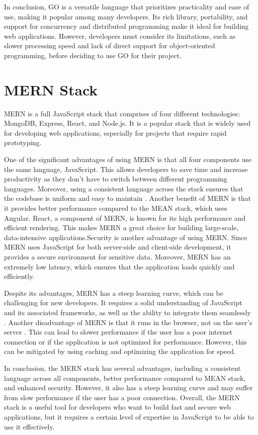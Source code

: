 In conclusion, GO is a versatile language that prioritizes practicality and ease of use, making it popular among many developers. Its rich library, portability, and support for concurrency and distributed programming make it ideal for building web applications. However, developers must consider its limitations, such as slower processing speed and lack of direct support for object-oriented programming, before deciding to use GO for their project.

\section{MERN Stack}
MERN is a full JavaScript stack that comprises of four different technologies: MongoDB, Express, React, and Node.js. It is a popular stack that is widely used for developing web applications, especially for projects that require rapid prototyping.

One of the significant advantages of using MERN is that all four components use the same language, JavaScript. This allows developers to save time and increase productivity as they don't have to switch between different programming languages. Moreover, using a consistent language across the stack ensures that the codebase is uniform and easy to maintain \cite{shama}. Another benefit of MERN is that it provides better performance compared to the MEAN stack, which uses Angular. React, a component of MERN, is known for its high performance and efficient rendering. This makes MERN a great choice for building large-scale, data-intensive applications.Security is another advantage of using MERN. Since MERN uses JavaScript for both server-side and client-side development, it provides a secure environment for sensitive data. Moreover, MERN has an extremely low latency, which ensures that the application loads quickly and efficiently.

Despite its advantages, MERN has a steep learning curve, which can be challenging for new developers. It requires a solid understanding of JavaScript and its associated frameworks, as well as the ability to integrate them seamlessly \cite{eddy}. Another disadvantage of MERN is that it runs in the browser, not on the user's server \cite{asvj}. This can lead to slower performance if the user has a poor internet connection or if the application is not optimized for performance. However, this can be mitigated by using caching and optimizing the application for speed.

In conclusion, the MERN stack has several advantages, including a consistent language across all components, better performance compared to MEAN stack, and enhanced security. However, it also has a steep learning curve and may suffer from slow performance if the user has a poor connection. Overall, the MERN stack is a useful tool for developers who want to build fast and secure web applications, but it requires a certain level of expertise in JavaScript to be able to use it effectively.
